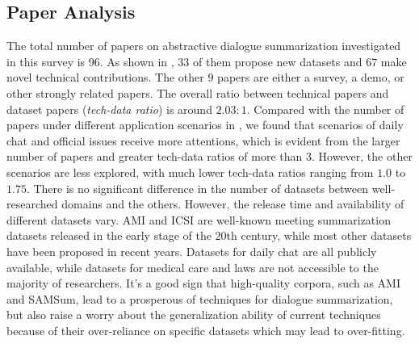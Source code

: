 \subsection{Paper Analysis}\label{sec:observations}
The total number of papers on abstractive dialogue summarization investigated 
in this survey is $96$. 
As shown in , $33$ of them propose new datasets and 
$67$ make novel technical contributions. The other $9$ papers are either 
a survey, a demo, or other strongly related papers. 
The overall ratio between technical papers and dataset papers 
(\textit{tech-data ratio}) is around $2.03:1$. Compared with the number of 
papers under different application scenarios in , 
we found that scenarios of daily chat and official issues receive more 
attentions, which is evident from the larger number of papers and 
greater tech-data ratios of more than $3$.
However, the other scenarios are less explored, with much lower 
tech-data ratios ranging from $1.0$ to $1.75$.
There is no significant difference in the number of datasets between
well-researched domains and the others. However, the release time and availability of different datasets vary.
AMI and ICSI are well-known meeting summarization datasets released in the early stage of the $20$th century, while most other datasets have been proposed in recent years.
Datasets for daily chat are all publicly available, while datasets for medical care and laws are not accessible to the majority of researchers. It's a good sign that high-quality corpora, such as AMI and SAMSum, lead to a prosperous of techniques for dialogue summarization, but also raise a worry about the generalization ability of current techniques because of their over-reliance on specific datasets which may lead to over-fitting.


